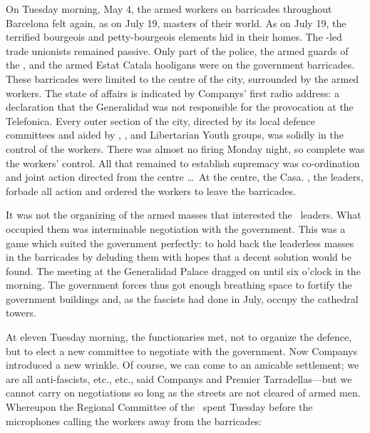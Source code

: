 On Tuesday morning, May 4, the armed workers on barricades throughout Barcelona felt again, as on July 19, masters of their world. As on July 19, the terrified bourgeois and petty-bourgeois elements hid in their homes. The \PSUC-led trade unionists remained passive. Only part of the police, the armed guards of the \PSUC, and the armed Estat Catala hooligans were on the government barricades. These barricades were limited to the centre of the city, surrounded by the armed workers. The state of affairs is indicated by Companys’ first radio address: a declaration that the Generalidad was not responsible for the provocation at the Telefonica. Every outer section of the city, directed by its local defence committees and aided by \POUM, \FAI, and Libertarian Youth groups, was solidly in the control of the workers. There was almost no firing Monday night, so complete was the workers’ control. All that remained to establish supremacy was co-ordination and joint action directed from the centre \dots\ At the centre, the Casa. \CNT, the leaders, forbade all action and ordered the workers to leave the barricades.

It was not the organizing of the armed masses that interested the \CNT\ leaders. What occupied them was interminable negotiation with the government. This was a game which suited the government perfectly: to hold back the leaderless masses in the barricades by deluding them with hopes that a decent solution would be found. The meeting at the Generalidad Palace dragged on until six o’clock in the morning. The government forces thus got enough breathing space to fortify the government buildings and, as the fascists had done in July, occupy the cathedral towers.

At eleven Tuesday morning, the functionaries met, not to organize the defence, but to elect a new committee to negotiate with the government. Now Companys introduced a new wrinkle. Of course, we can come to an amicable settlement; we are all anti-fascists, etc., etc., said Companys and Premier Tarradellas---but we cannot carry on negotiations so long as the streets are not cleared of armed men. Whereupon the Regional Committee of the \CNT\ spent Tuesday before the microphones calling the workers away from the barricades:


